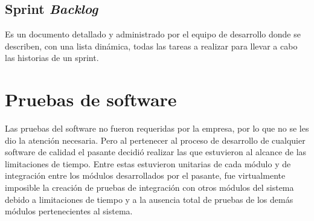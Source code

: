 \subsection{Sprint \emph{Backlog}}
Es un documento detallado y administrado por el equipo de desarrollo donde se describen, con una lista dinámica, todas las tareas a realizar para llevar a cabo las historias de un sprint.

\section{Pruebas de software}

Las pruebas del software no fueron requeridas por la empresa, por lo que no se les dio la atención necesaria. Pero al pertenecer al proceso de desarrollo de cualquier software de calidad el pasante decidió realizar las que estuvieron al alcance de las limitaciones de tiempo. Entre estas estuvieron unitarias de cada módulo y de integración entre los módulos desarrollados por el pasante, fue virtualmente imposible la creación de pruebas de integración con otros módulos del sistema debido a limitaciones de tiempo y a la ausencia total de pruebas de los demás módulos pertenecientes al sistema.

